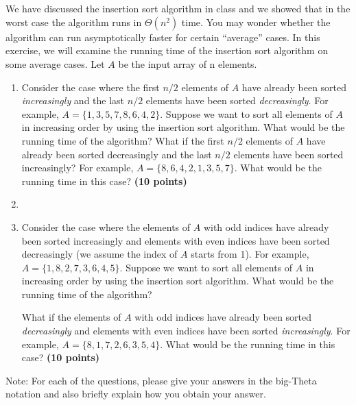\documentclass{article}
\begin{document}
\section{}
We have discussed the insertion sort algorithm in class and we showed
that in the worst case the algorithm runs in $\Theta(n^2)$ time. You
may wonder whether the algorithm can run asymptotically faster for
certain ``average'' cases. In this exercise, we will examine the running
time of the insertion sort algorithm on some average cases. Let $A$ be 
the input array of n elements.
\begin{enumerate}[label=(\alph*)]
\item Consider the case where the first $n/2$ elements of $A$ have
already been sorted \emph{increasingly} and the last $n/2$ elements
have been sorted \emph{decreasingly}. For example, $A = \{1, 3, 5, 7,
8, 6, 4, 2\}$. Suppose we want to sort all elements of $A$ in
increasing order by using the insertion sort algorithm. What would be
the running time of the algorithm? What if the first $n/2$ elements of
$A$ have already been sorted decreasingly and the last $n/2$ elements
have been sorted increasingly? For example, $A = \{8, 6, 4, 2, 1, 3,
5, 7\}$. What would be the running time in this case? {\bf (10 points)}
\item[] 

\item Consider the case where the elements of $A$ with odd indices have
already been sorted increasingly and elements with even indices have
been sorted decreasingly (we assume the index of $A$ starts from
1). For example, $A = \{1, 8, 2, 7, 3, 6, 4, 5\}$. Suppose we want to
sort all elements of $A$ in increasing order by using the insertion
sort algorithm. What would be the running time of the algorithm?

What if the elements of $A$ with odd indices have already been sorted
\emph{decreasingly} and elements with even indices have been sorted 
\emph{increasingly}. For example, $A = \{8, 1, 7, 2, 6, 3, 5,
4\}$. What would be the running time in this case?  {\bf (10 points)}
\end{enumerate}

Note: For each of the questions, please give your answers in the
big-Theta notation and also briefly explain how you obtain your answer.
\end{document}
